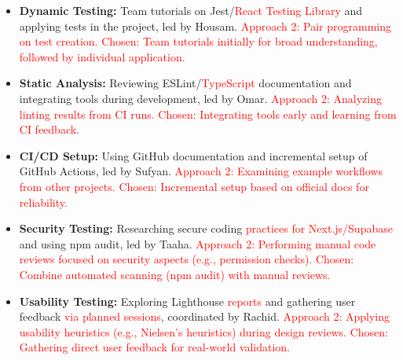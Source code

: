 \documentclass[12pt, titlepage]{article}
\begin{document}
\begin{enumerate}
  \begin{itemize}
    \item \textbf{Dynamic Testing:} Team tutorials on Jest/\textcolor{red}{React Testing Library} and applying tests in the project, led by Housam. \textcolor{red}{Approach 2: Pair programming on test creation.} \textcolor{red}{Chosen: Team tutorials initially for broad understanding, followed by individual application.}
    \item \textbf{Static Analysis:} Reviewing ESLint/\textcolor{red}{TypeScript} documentation and integrating tools during development, led by Omar. \textcolor{red}{Approach 2: Analyzing linting results from CI runs.} \textcolor{red}{Chosen: Integrating tools early and learning from CI feedback.}
    \item \textbf{CI/CD Setup:} Using GitHub documentation and incremental setup of GitHub Actions, led by Sufyan. \textcolor{red}{Approach 2: Examining example workflows from other projects.} \textcolor{red}{Chosen: Incremental setup based on official docs for reliability.}
    \item \textbf{Security Testing:} Researching secure coding \textcolor{red}{practices for Next.js/Supabase} and using npm audit, led by Taaha. \textcolor{red}{Approach 2: Performing manual code reviews focused on security aspects (e.g., permission checks).} \textcolor{red}{Chosen: Combine automated scanning (npm audit) with manual reviews.}
    \item \textbf{Usability Testing:} Exploring Lighthouse \textcolor{red}{reports} and gathering user feedback \textcolor{red}{via planned sessions}, coordinated by Rachid. \textcolor{red}{Approach 2: Applying usability heuristics (e.g., Nielsen's heuristics) during design reviews.} \textcolor{red}{Chosen: Gathering direct user feedback for real-world validation.}
\end{itemize}

\end{enumerate}
\end{document}
